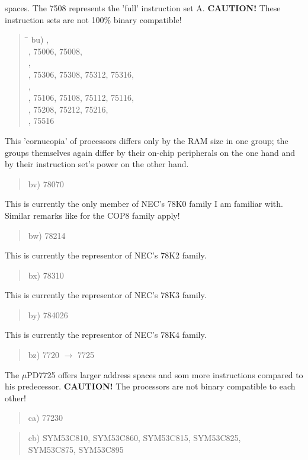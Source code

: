 \documentclass[12pt,twoside]{report}
\begin{document}
spaces.  The 7508 represents the 'full' instruction set A.  {\bf
CAUTION!} These instruction sets are not 100\% binary compatible!
\begin{quote}
\begin{tabbing}
\hspace{0.7cm} \= \kill
bu) ,\\
    , 75006, 75008,\\
    ,\\
    , 75306, 75308, 75312, 75316,\\
    ,\\
    , 75106, 75108, 75112, 75116,\\
    , 75208, 75212, 75216,\\
    , 75516\\
\end{tabbing}
\end{quote}
This 'cornucopia' of processors differs only by the RAM size in one
group; the groups themselves again differ by their on-chip
peripherals on the one hand and by their instruction set's power on
the other hand.
\begin{quote}
bv) 78070
\end{quote}
This is currently the only member of NEC's 78K0 family I am familiar
with.  Similar remarks like for the COP8 family apply!
\begin{quote}
bw) 78214
\end{quote}
This is currently the representor of NEC's 78K2 family.
\begin{quote}
bx) 78310
\end{quote}
This is currently the representor of NEC's 78K3 family.
\begin{quote}
by) 784026
\end{quote}
This is currently the representor of NEC's 78K4 family.
\begin{quote}
bz) 7720 $\rightarrow$ 7725
\end{quote}
The $\mu$PD7725 offers larger address spaces and som more instructions
compared to his predecessor. {\bf CAUTION!}  The processors are not binary
compatible to each other!
\begin{quote}
ca) 77230
\end{quote}
\begin{quote}
\begin{tabbing}
cb) \= SYM53C810, SYM53C860, SYM53C815, SYM53C825, \\
    \> SYM53C875, SYM53C895
\end{tabbing}
\end{quote}
\end{document}
